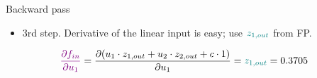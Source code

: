 \begin{vbframe}{Backward pass}
  \begin{itemize}
    \item 3rd step. Derivative of the linear input is easy; use $\textcolor{teal}{z_{1, out}}$ from FP.
  \end{itemize}
    \begin{eqnarray*}
      \textcolor{violet}{\frac{\partial f_{in}}{\partial u_1}} = \frac{\partial (u_1 \cdot z_{1,out} + u_2 \cdot z_{2,out} + c \cdot 1)}{\partial u_1} = \textcolor{teal}{z_{1, out}} = \num[round-mode=places,round-precision=4]{0.3705169}
    \end{eqnarray*}
    \begin{figure}
      \centering
    \end{figure}
\framebreak


\end{vbframe}
